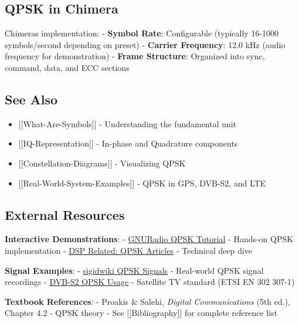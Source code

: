 \subsection{QPSK in Chimera}\label{qpsk-in-chimera}

Chimera\textquotesingle s implementation: - \textbf{Symbol Rate}:
Configurable (typically 16-1000 symbols/second depending on preset) -
\textbf{Carrier Frequency}: 12.0 kHz (audio frequency for demonstration)
- \textbf{Frame Structure}: Organized into sync, command, data, and ECC
sections

\subsection{See Also}\label{see-also}

\begin{itemize}
\tightlist
\item
  {[}{[}What-Are-Symbols{]}{]} - Understanding the fundamental unit
\item
  {[}{[}IQ-Representation{]}{]} - In-phase and Quadrature components
\item
  {[}{[}Constellation-Diagrams{]}{]} - Visualizing QPSK
\item
  {[}{[}Real-World-System-Examples{]}{]} - QPSK in GPS, DVB-S2, and LTE
\end{itemize}

\subsection{External Resources}\label{external-resources}

\textbf{Interactive Demonstrations}: -
\href{https://wiki.gnuradio.org/index.php/Guided_Tutorial_PSK_Demodulation}{GNURadio
QPSK Tutorial} - Hands-on QPSK implementation -
\href{https://www.dsprelated.com/showarticle/153.php}{DSP Related: QPSK
Articles} - Technical deep dive

\textbf{Signal Examples}: -
\href{https://www.sigidwiki.com/wiki/Category:QPSK}{sigidwiki QPSK
Signals} - Real-world QPSK signal recordings -
\href{https://www.etsi.org/deliver/etsi_en/302300_302399/30230701/}{DVB-S2
QPSK Usage} - Satellite TV standard (ETSI EN 302 307-1)

\textbf{Textbook References}: - Proakis \& Salehi, \emph{Digital
Communications} (5th ed.), Chapter 4.2 - QPSK theory - See
{[}{[}Bibliography{]}{]} for complete reference list

